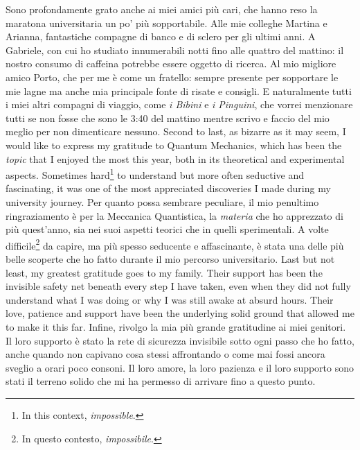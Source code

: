 \begin{paracol}{2}
    \switchcolumn
    Sono profondamente grato anche ai miei amici più cari, che hanno reso la maratona universitaria un po' più sopportabile. Alle mie colleghe Martina e Arianna, fantastiche compagne di banco e di sclero per gli ultimi anni. A Gabriele, con cui ho studiato innumerabili notti fino alle quattro del mattino: il nostro consumo di caffeina potrebbe essere oggetto di ricerca. Al mio migliore amico Porto, che per me è come un fratello: sempre presente per sopportare le mie lagne ma anche mia principale fonte di risate e consigli. E naturalmente tutti i miei altri compagni di viaggio, come \emph{i Bibini} e \emph{i Pinguini}, che vorrei menzionare tutti se non fosse che sono le 3:40 del mattino mentre scrivo e faccio del mio meglio per non dimenticare nessuno.
    \switchcolumn*
    Second to last, as bizarre as it may seem, I would like to express my gratitude to Quantum Mechanics, which has been the \emph{topic} that I enjoyed the most this year, both in its theoretical and experimental aspects. Sometimes hard\footnote{In this context, \emph{impossible}.} to understand but more often seductive and fascinating, it was one of the most appreciated discoveries I made during my university journey.
    \switchcolumn
    Per quanto possa sembrare peculiare, il mio penultimo ringraziamento è per la Meccanica Quantistica, la \emph{materia} che ho apprezzato di più quest'anno, sia nei suoi aspetti teorici che in quelli sperimentali. A volte difficile\footnote{In questo contesto, \emph{impossibile}.} da capire, ma più spesso seducente e affascinante, è stata una delle più belle scoperte che ho fatto durante il mio percorso universitario.
    \switchcolumn*
    Last but not least, my greatest gratitude goes to my family. Their support has been the invisible safety net beneath every step I have taken, even when they did not fully understand what I was doing or why I was still awake at absurd hours. Their love, patience and support have been the underlying solid ground that allowed me to make it this far.
    \switchcolumn
    Infine, rivolgo la mia più grande gratitudine ai miei genitori. Il loro supporto è stato la rete di sicurezza invisibile sotto ogni passo che ho fatto, anche quando non capivano cosa stessi affrontando o come mai fossi ancora sveglio a orari poco consoni. Il loro amore, la loro pazienza e il loro supporto sono stati il terreno solido che mi ha permesso di arrivare fino a questo punto.
\end{paracol}